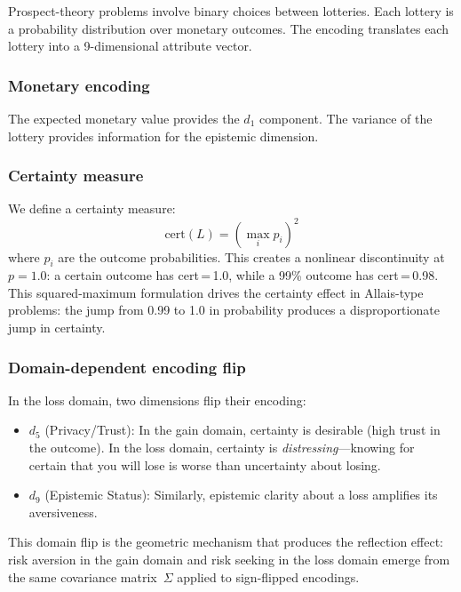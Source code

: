 \documentclass[journal]{IEEEtran}
\begin{document}
Prospect-theory problems involve binary choices between lotteries.
Each lottery is a probability distribution over monetary outcomes.
The encoding translates each lottery into a 9-dimensional attribute vector.

\subsubsection{Monetary encoding}
The expected monetary value provides the $d_1$ component.
The variance of the lottery provides information for the epistemic dimension.

\subsubsection{Certainty measure}
We define a certainty measure:
\begin{equation}
    \text{cert}(L) = \left(\max_i p_i\right)^2
    \label{eq:certainty}
\end{equation}
where $p_i$ are the outcome probabilities.
This creates a nonlinear discontinuity at $p = 1.0$: a certain outcome has cert\,=\,1.0, while a 99\% outcome has cert\,=\,0.98.
This squared-maximum formulation drives the certainty effect in Allais-type problems: the jump from 0.99 to 1.0 in probability produces a disproportionate jump in certainty.

\subsubsection{Domain-dependent encoding flip}
In the loss domain, two dimensions flip their encoding:
\begin{itemize}
    \item $d_5$ (Privacy/Trust): In the gain domain, certainty is desirable (high trust in the outcome). In the loss domain, certainty is \emph{distressing}---knowing for certain that you will lose is worse than uncertainty about losing.
    \item $d_9$ (Epistemic Status): Similarly, epistemic clarity about a loss amplifies its aversiveness.
\end{itemize}
This domain flip is the geometric mechanism that produces the reflection effect: risk aversion in the gain domain and risk seeking in the loss domain emerge from the same covariance matrix~$\Sigma$ applied to sign-flipped encodings.
\end{document}
